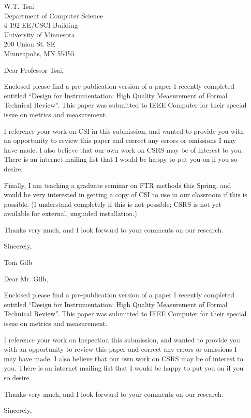 \begin {letter}
  {W.T. Tsai\\
   Department of Computer Science\\
   4-192 EE/CSCI Building\\
   University of Minnesota\\
   200 Union St. SE\\
   Minneapolis, MN 55455}

\opening {Dear Professor Tsai,}

Enclosed please find a pre-publication version of a paper I recently
completed entitled ``Design for Instrumentation: High Quality Measurement
of Formal Technical Review''.  This paper was submitted to IEEE Computer
for their special issue on metrics and measurement.

I reference your work on CSI in 
this submission, and wanted to provide you with an opportunity to review
this paper and correct any errors or omissions I may have made.  I also
believe that our own work on CSRS may be of interest to you.  There is an
internet mailing list that I would be happy to put you on if you so desire.

Finally, I am teaching a graduate seminar on FTR methods this Spring, and
would be very interested in getting a copy of CSI to use in our classroom
if this is possible.  (I understand completely if this is not possible;
CSRS is not yet available for external, unguided installation.)

Thanks very much, and I look forward to your comments on our research.

\closing{Sincerely,}

\end{letter}

\begin {letter}
  {Tom Gilb}

\opening {Dear Mr. Gilb,}

Enclosed please find a pre-publication version of a paper I recently
completed entitled ``Design for Instrumentation: High Quality Measurement
of Formal Technical Review''.  This paper was submitted to IEEE Computer
for their special issue on metrics and measurement.

I reference your work on Inspection
this submission, and wanted to provide you with an opportunity to review
this paper and correct any errors or omissions I may have made.  I also
believe that our own work on CSRS may be of interest to you.  There is an
internet mailing list that I would be happy to put you on if you so desire.

Thanks very much, and I look forward to your comments on our research.

\closing{Sincerely,}

\end{letter}


